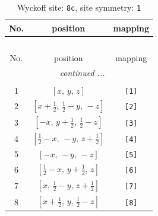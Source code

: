 \documentclass[fleqn,8pt]{jsarticle}
\begin{document}
\renewcommand{\arraystretch}{1.2}
\begin{longtable}{ccc}
\caption{Wyckoff site: {\tt 8c}, site symmetry: {\tt 1}}
 \\
 \hline \hline
No. & position & mapping \\ \hline \endfirsthead

\multicolumn{2}{l}{\tablename\ \thetable{}} \\
 \hline \hline
No. & position & mapping \\ \hline \endhead

 \hline \hline
\multicolumn{2}{r}{\footnotesize\it continued ...} \\ \endfoot

 \hline \hline
\multicolumn{2}{r}{} \\ \endlastfoot

1 & $\left[ x,\, y,\, z \right]$ & {\tt [1]} \\ \hline
2 & $\left[ x + \frac{1}{2},\, \frac{1}{2} - y,\, - z \right]$ & {\tt [2]} \\ \hline
3 & $\left[ - x,\, y + \frac{1}{2},\, \frac{1}{2} - z \right]$ & {\tt [3]} \\ \hline
4 & $\left[ \frac{1}{2} - x,\, - y,\, z + \frac{1}{2} \right]$ & {\tt [4]} \\ \hline
5 & $\left[ - x,\, - y,\, - z \right]$ & {\tt [5]} \\ \hline
6 & $\left[ \frac{1}{2} - x,\, y + \frac{1}{2},\, z \right]$ & {\tt [6]} \\ \hline
7 & $\left[ x,\, \frac{1}{2} - y,\, z + \frac{1}{2} \right]$ & {\tt [7]} \\ \hline
8 & $\left[ x + \frac{1}{2},\, y,\, \frac{1}{2} - z \right]$ & {\tt [8]} \\
\end{longtable}
\end{document}
